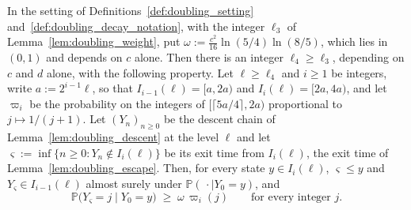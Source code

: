 \begin{lemma}\label{lem:doubling_doeblin}
In the setting of Definitions~\ref{def:doubling_setting} and~\ref{def:doubling_decay_notation},
with the integer $\ell_3$ of Lemma~\ref{lem:doubling_weight}, put
$\omega:=\tfrac{c^2}{16}\ln(5/4)\ln(8/5)$, which lies in $(0,1)$ and depends on $c$ alone. Then
there is an integer $\ell_4\geq\ell_3$, depending on $c$ and $d$ alone, with the following
property. Let $\ell\geq\ell_4$ and $i\geq1$ be integers, write $a:=2^{i-1}\ell$, so that
$I_{i-1}(\ell)=[a,2a)$ and $I_i(\ell)=[2a,4a)$, and let $\varpi_i$ be the probability on the
integers of $[\lceil5a/4\rceil,2a)$ proportional to $j\mapsto1/(j+1)$. Let $(Y_n)_{n\geq0}$ be
the descent chain of Lemma~\ref{lem:doubling_descent} at the level $\ell$ and let
$\varsigma:=\inf\{n\geq0:Y_n\notin I_i(\ell)\}$ be its exit time from $I_i(\ell)$, the exit time
of Lemma~\ref{lem:doubling_escape}. Then, for every state $y\in I_i(\ell)$, $\varsigma\leq y$
and $Y_\varsigma\in I_{i-1}(\ell)$ almost surely under $\mathbb P(\,\cdot\mid Y_0=y)$, and
\begin{equation}\label{eq:doubling_doeblin}
    \mathbb P\bigl(Y_\varsigma=j\mid Y_0=y\bigr)\;\geq\;\omega\,\varpi_i(j)
    \qquad\text{for every integer }j .
\end{equation}
\end{lemma}

